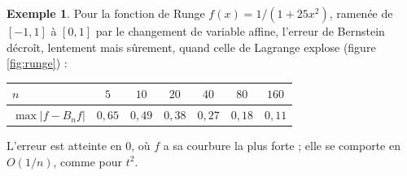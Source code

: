 \documentclass[11pt,a4paper]{article}
\theoremstyle{plain}
\theoremstyle{definition}
\newtheorem{exemple}[theoreme]{Exemple}
\theoremstyle{remark}
\begin{document}
\begin{exemple}\label{ex:runge}
Pour la fonction de Runge $f(x)=1/(1+25x^2)$, ramenée de $[-1,1]$ à $[0,1]$ par le changement de variable affine, l'erreur de Bernstein décroît, lentement mais sûrement, quand celle de Lagrange explose (figure \ref{fig:runge}) :

\begin{center}
\begin{tabular}{@{}lcccccc@{}}
\toprule
$n$ & $5$ & $10$ & $20$ & $40$ & $80$ & $160$ \\
\midrule
$\max|f-B_nf|$ & $0{,}65$ & $0{,}49$ & $0{,}38$ & $0{,}27$ & $0{,}18$ & $0{,}11$ \\
\bottomrule
\end{tabular}
\end{center}
L'erreur est atteinte en $0$, où $f$ a sa courbure la plus forte ; elle se comporte en $O(1/n)$, comme pour $t^2$.
\end{exemple}
\end{document}
